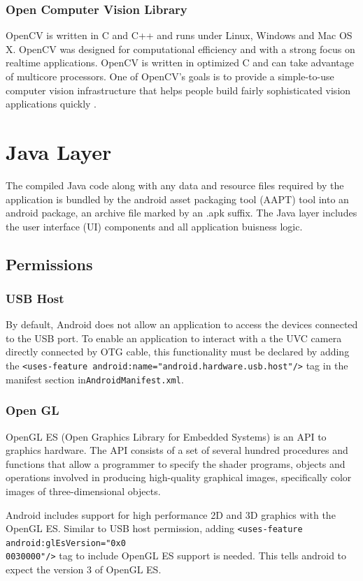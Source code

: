 \subsubsection{Open Computer Vision Library}
OpenCV is written in C and C++ and runs under Linux, Windows and Mac OS X. OpenCV was designed for computational efficiency and with a strong focus on realtime applications. OpenCV is written in optimized C and can take advantage of multicore processors. One of OpenCV’s goals is to provide a simple-to-use computer vision infrastructure that helps people build fairly sophisticated vision applications quickly \parencite{openCv}.



\section{Java Layer}


The compiled Java code along with any data and resource files required by the application is bundled by the android asset packaging tool (AAPT) tool into an android package, an archive file marked by an .apk suffix.
The Java layer includes the user interface (UI) components and all application buisness logic.

\subsection{Permissions}
\subsubsection{USB Host}
By default, Android does not allow an application to access the devices connected to the USB  port. To enable an application to interact with a the UVC camera directly connected by OTG cable, this functionality must be declared by adding the \texttt{<uses-feature android:name="android.hardware.usb.host"/>} tag in the manifest section in\texttt{AndroidManifest.xml}. 

\subsubsection{Open GL}

OpenGL ES (Open Graphics Library for Embedded Systems) is an API to graphics hardware. The API consists of a set of several hundred procedures and functions that allow a programmer to specify the shader programs, objects and operations involved in producing high-quality graphical images, specifically color images of three-dimensional objects\parencite{openGl}.


Android includes support for high performance 2D and 3D graphics with the OpenGL ES. Similar to USB host permission, adding  \texttt{<uses-feature android:glEsVersion="0x0\\0030000"/>} tag to include OpenGL ES support is needed. This tells android to expect the version 3 of OpenGL ES.








 
